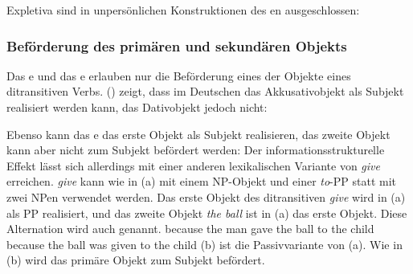 Expletiva sind in unpersönlichen Konstruktionen des en ausgeschlossen:
\nocite{MOe2011a}
\z
{}


\subsubsection{Beförderung des primären und sekundären Objekts}

Das e und das e erlauben nur die Beförderung eines der Objekte eines ditransitiven Verbs. ()
zeigt, dass im Deutschen das Akkusativobjekt als Subjekt realisiert werden kann, das Dativobjekt jedoch nicht:
\eal
{}
\zl

\noindent
Ebenso kann das e das erste Objekt als Subjekt realisieren, das zweite Objekt kann aber nicht zum Subjekt befördert werden:
\eal
{}
\zl
Der informationsstrukturelle Effekt lässt sich allerdings mit einer anderen lexikalischen Variante von \emph{give}
erreichen. \emph{give} kann wie in (a) mit einem NP-Objekt und einer \emph{to}-PP statt mit zwei NPen verwendet werden. Das erste Objekt des ditransitiven \emph{give} wird in (a) als PP realisiert, und das
zweite Objekt \emph{the ball} ist in (a) das erste Objekt. Diese Alternation wird auch \emph{} genannt.
\eal
\ex because the man gave the ball to the child
\ex because the ball was given to the child
\zl
(b) ist die Passivvariante von (a). Wie in (b) wird das primäre Objekt zum
Subjekt befördert.

